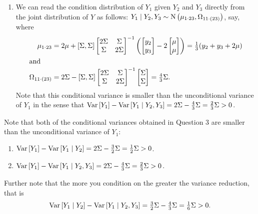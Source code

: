 \begin{enumerate}
\begin{enumerate}
            \item We can read the condition distribution of \( Y_{1} \) given \( Y_{2} \) and \( 
                  Y_{3} \) directly from the joint distribution of \( Y \) as follows: \( Y_{1}\mid 
                  Y_{2},Y_{3}\sim\operatorname{N}\left(\mu_{1\cdot 23},\Omega_{11\cdot(23)}\right) \), say, where
                  \begin{align*}
                     \mu_{1\cdot 23} & =2\mu+[\Sigma,\Sigma]
                     \begin{bmatrix}
                        2\Sigma & \Sigma \\
                        \Sigma & 2\Sigma
                     \end{bmatrix}^{-1}\left(
                     \begin{bmatrix}
                        y_{2} \\ y_{3}
                     \end{bmatrix}
                     -2
                     \begin{bmatrix}
                        \mu \\ \mu
                     \end{bmatrix}\right)
                     =\tfrac{1}{3}(y_{2}+y_{3}+2\mu)
                     \\
                     \shortintertext{and}
                     \Omega_{11\cdot(23)} & =2\Sigma-[\Sigma,\Sigma]
                     \begin{bmatrix}
                        2\Sigma & \Sigma \\
                        \Sigma & 2\Sigma
                     \end{bmatrix}^{-1}
                     \begin{bmatrix}
                        \Sigma \\
                        \Sigma
                     \end{bmatrix}=\tfrac{4}{3}\Sigma.
                  \end{align*}
                  Note that this conditional variance is smaller than the unconditional variance of 
                  \( Y_{1} \) in the sense that \( \operatorname{Var}\left[Y_{1}\right]-\operatorname{Var}\left[Y_{1}\mid 
                  Y_{2},Y_{3}\right]=2\Sigma-\tfrac{4}{3}\Sigma=\tfrac{2}{3}\Sigma>0 \).
         \end{enumerate}
\end{enumerate}
Note that both of the conditional variances obtained in Question 3 are smaller than the unconditional variance of 
\( Y_{1} \):
\begin{enumerate}
   \item \( \operatorname{Var}\left[Y_{1}\right]-\operatorname{Var}\left[Y_{1}\mid Y_{2}\right]=2\Sigma-\tfrac{3}{2}\Sigma=\tfrac{1}{2}\Sigma>0 \). 

   \item \( \operatorname{Var}\left[Y_{1}\right]-\operatorname{Var}\left[Y_{1}\mid Y_{2},Y_{3}\right]=2\Sigma-\tfrac{4}{3}\Sigma=\tfrac{2}{3}\Sigma>0 \).
\end{enumerate}
Further note that the more you condition on the greater the variance reduction, that is 
\[ 
   \operatorname{Var}\left[Y_{1}\mid Y_{2}\right]-\operatorname{Var}\left[Y_{1}\mid Y_{2},Y_{3}\right]=\tfrac{3}{2}\Sigma-\tfrac{4}{3}\Sigma=\tfrac{1}{6}\Sigma>0 .
\]

